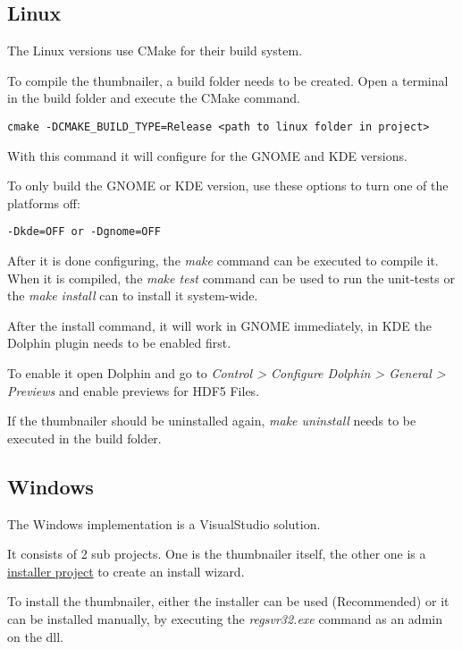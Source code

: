 \subsection{Linux}

The Linux versions use CMake for their build system.

To compile the thumbnailer, a build folder needs to be created.
Open a terminal in the build folder and execute the CMake command.

\begin{lstlisting}
cmake -DCMAKE_BUILD_TYPE=Release <path to linux folder in project>
\end{lstlisting}

With this command it will configure for the GNOME and KDE versions.

To only build the GNOME or KDE version, use these options to turn one of the platforms off:
\begin{lstlisting}
-Dkde=OFF or -Dgnome=OFF
\end{lstlisting}

After it is done configuring, the \emph{make} command can be executed to compile it.
When it is compiled, the \emph{make test} command can be used to run the unit-tests or
the \emph{make install} can to install it system-wide.

After the install command, it will work in GNOME immediately, in KDE the Dolphin plugin needs to be enabled first.

To enable it open Dolphin and go to \emph{Control > Configure Dolphin > General > Previews}
and enable previews for HDF5 Files.

If the thumbnailer should be uninstalled again, \emph{make uninstall} needs to be executed in the build folder.

\subsection{Windows}

The Windows implementation is a VisualStudio solution.

It consists of 2 sub projects. One is the thumbnailer itself,
the other one is a \href{https://marketplace.visualstudio.com/items?itemName=VisualStudioProductTeam.MicrosoftVisualStudio2017InstallerProjects}{installer project}
to create an install wizard.

To install the thumbnailer, either the installer can be used (Recommended) or it can be installed manually,
by executing the \emph{regsvr32.exe} command as an admin on the dll.

